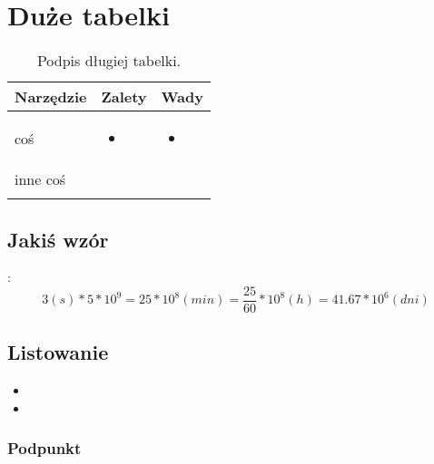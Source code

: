 \chapter{Duże tabelki}
\lipsum[22-26]
\begin{longtable}{|p{2.5cm}|p{6.5cm}|p{6.5cm}|}
	\hline
	\textbf{Narzędzie} &
	\textbf{Zalety} &
	\textbf{Wady} \\ \hline\hline
	coś &\begin{itemize}
		\item \lipsum[1]
	\end{itemize} &
	\begin{itemize}
		\item \lipsum[4]
	\end{itemize}  \\
	\hline
	inne coś & \lipsum[2] & \lipsum[3]\\
	\hline
	\caption{Podpis długiej tabelki.}
	\label{tab:narzedzia}
\end{longtable}

\section{Jakiś wzór}
\noindent \lipsum[7]:
$$3(s) * 5 * 10^{9} = 25 * 10^{8}(min) = \frac{25}{60} * 10^{8}(h) = 41.67 * 10^{6} (dni)\label{obliczenia}$$

\section{Listowanie}
\begin{itemize}
	\item \lipsum[8]
	\item \lipsum[9]
\end{itemize}

\subsection{Podpunkt}
\label{labelka_dla_podpunktu}
\noindent \lipsum[10-12]
